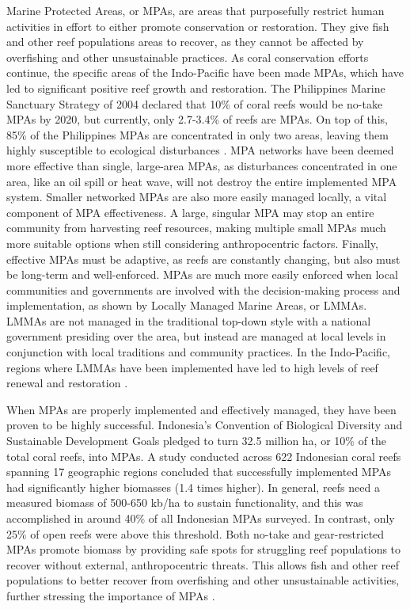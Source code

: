 \documentclass{book}\usepackage{knitr}
\begin{document}
\begin{knitrout}
\begin{kframe}
Marine Protected Areas, or MPAs, are areas that purposefully restrict human activities in effort to either promote conservation or restoration. They give fish and other reef populations areas to recover, as they cannot be affected by overfishing and other unsustainable practices. As coral conservation efforts continue, the specific areas of the Indo-Pacific have been made MPAs, which have led to significant positive reef growth and restoration. The Philippines Marine Sanctuary Strategy of 2004 declared that 10\% of coral reefs would be no-take MPAs by 2020, but currently, only 2.7-3.4\% of reefs are MPAs. On top of this, 85\% of the Philippines MPAs are concentrated in only two areas, leaving them highly susceptible to ecological disturbances \citep{10.2307/40603378}. MPA networks have been deemed more effective than single, large-area MPAs, as disturbances concentrated in one area, like an oil spill or heat wave, will not destroy the entire implemented MPA system. Smaller networked MPAs are also more easily managed locally, a vital component of MPA effectiveness. A large, singular MPA may stop an entire community from harvesting reef resources, making multiple small MPAs much more suitable options when still considering anthropocentric factors\citep{Keller2009ClimateCC}. Finally, effective MPAs must be adaptive, as reefs are constantly changing, but also must be long-term and well-enforced. MPAs are much more easily enforced when local communities and governments are involved with the decision-making process and implementation, as shown by Locally Managed Marine Areas, or LMMAs. LMMAs are not managed in the traditional top-down style with a national government presiding over the area, but instead are managed at local levels in conjunction with local traditions and community practices. In the Indo-Pacific, regions where LMMAs have been implemented have led to high levels of reef renewal and restoration \citep{cgarden}. 

When MPAs are properly implemented and effectively managed, they have been proven to be highly successful. Indonesia’s Convention of Biological Diversity and Sustainable Development Goals pledged to turn 32.5 million ha, or 10\% of the total coral reefs, into MPAs. A study conducted across 622 Indonesian coral reefs spanning 17 geographic regions concluded that successfully implemented MPAs had significantly higher biomasses (1.4 times higher). In general, reefs need a measured biomass of 500-650 kb/ha to sustain functionality, and this was accomplished in around 40\% of all Indonesian MPAs surveyed. In contrast, only 25\% of open reefs were above this threshold. Both no-take and gear-restricted MPAs promote biomass by providing safe spots for struggling reef populations to recover without external, anthropocentric threats. This allows fish and other reef populations to better recover from overfishing and other unsustainable activities, further stressing the importance of MPAs \citep{https://doi.org/10.1111/conl.12698}. 


\end{kframe}
\end{knitrout}
\end{document}
